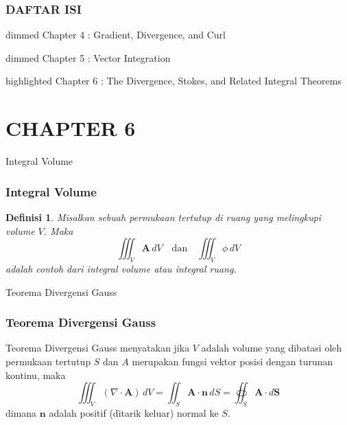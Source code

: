 \documentclass[10pt]{beamer}
\newtheorem{definisi}{Definisi}
\begin{document}
    



\begin{frame} 
\frametitle{DAFTAR ISI}
    \begin{beamercolorbox}
        [wd=\textwidth,rounded=true,shadow=true]{dimmed}
        Chapter 4 : Gradient, Divergence, and Curl
    \end{beamercolorbox}
    \vspace{2ex}
    \begin{beamercolorbox}
        [wd=\textwidth,rounded=true,shadow=true]{dimmed}
        Chapter 5 : Vector Integration
    \end{beamercolorbox}
    \vspace{2ex}
    \begin{beamercolorbox}
        [wd=\textwidth,rounded=true,shadow=true]{highlighted}
        Chapter 6 : The Divergence, Stokes, and Related Integral Theorems
    \end{beamercolorbox}
    \vspace{2ex}   
\end{frame}





\section{CHAPTER 6}

\begin{frame}{Integral Volume}
\frametitle{Integral Volume}
\justifying
\begin{definisi}
Misalkan sebuah permukaan tertutup di ruang yang melingkupi volume $V$. Maka
\[
\iiint_V \mathbf{A}\, dV \quad \text{dan} \quad \iiint_V \phi\, dV
\]
adalah contoh dari \textit{integral volume} atau \textit{integral ruang}.
\end{definisi}
\end{frame}

\begin{frame}{Teorema Divergensi Gauss}
\frametitle{Teorema Divergensi Gauss}
\justifying
\begin{theorem}
    Teorema Divergensi Gauss menyatakan jika $V$ adalah volume yang dibatasi oleh permukaan tertutup \( S \) dan \( A \) merupakan fungsi vektor posisi dengan turunan kontinu, maka
    \[
\iiint_V (\nabla \cdot \mathbf{A}) \, dV = \iint_S \mathbf{A} \cdot \mathbf{n} \, dS = \oiint_S \mathbf{A} \cdot d\mathbf{S}
\]
dimana \( \mathbf{n} \) adalah positif (ditarik keluar) normal ke \( S \).
\end{theorem}
\end{frame}
\end{document}
